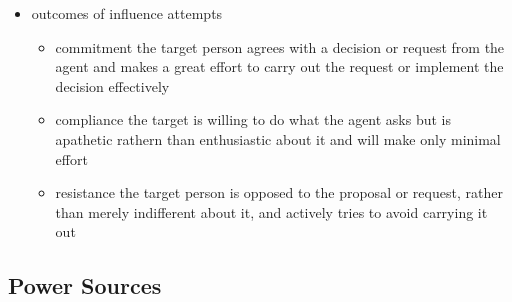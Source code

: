\begin{itemize}
	\item outcomes of influence attempts
	\begin{itemize}
		\item commitment ­the target person agrees with a decision or request from the agent and makes a great effort to carry out the request or implement the decision effectively
		\item compliance ­the target is willing to do what the agent asks but is apathetic rathern than enthusiastic about it and will make only minimal effort 
		\item resistance ­the target person is opposed to the proposal or request, rather than merely indifferent about it, and actively tries to avoid carrying it out
	\end{itemize}
	
\end{itemize}



\subsection{Power Sources} %
\label{sub:power_sources}


